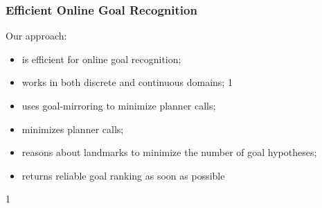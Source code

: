 \documentclass{beamer}
\newcommand{\todo}[1]{ {\color{red} #1} }
\def\masterclass{1}
\begin{document}
	\begin{frame}[c]\frametitle{Efficient Online Goal Recognition}
		Our approach:
		\begin{itemize}
			\item is efficient for online goal recognition;
			\item works in both discrete and continuous domains;
			\if\masterclass1
			\item uses goal-mirroring to minimize planner calls;
			\else
			\item minimizes planner calls;
			\fi
			\item reasons about landmarks to minimize the number of goal hypotheses; 
			\item returns reliable goal ranking as soon as possible
		\end{itemize}
	\end{frame}
	
\if\masterclass1
	
\end{document}
